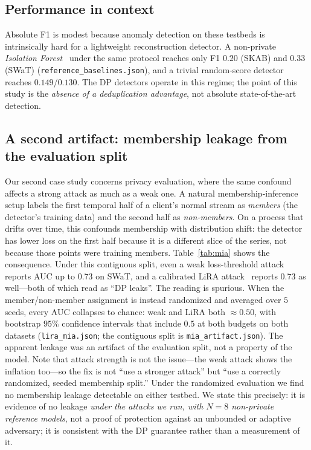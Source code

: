 \documentclass[pdflatex,sn-mathphys-num]{sn-jnl}
\theoremstyle{thmstyleone}
\theoremstyle{thmstyletwo}
\theoremstyle{thmstylethree}
\begin{document}
\subsection{Performance in context}\label{sec:res-context}
Absolute F1 is modest because anomaly detection on these testbeds is intrinsically
hard for a lightweight reconstruction detector. A non-private \emph{Isolation
Forest}~\cite{liu2008isolation} under the same protocol reaches only F1 $0.20$
(SKAB) and $0.33$ (SWaT) (\texttt{reference\_baselines.json}), and a trivial
random-score detector reaches $0.149$/$0.130$. The DP detectors operate in this
regime; the point of this study is the \emph{absence of a deduplication advantage},
not absolute state-of-the-art detection.

\subsection{A second artifact: membership leakage from the evaluation split}\label{sec:res-privacy}
Our second case study concerns privacy evaluation, where the same confound affects a strong attack as much as a weak one. A natural membership-inference setup labels the first
temporal half of a client's normal stream as \emph{members} (the detector's training
data) and the second half as \emph{non-members}. On a process that drifts over time,
this confounds membership with distribution shift: the detector has lower loss on the
first half because it is a different slice of the series, not because those points
were training members. Table~\ref{tab:mia} shows the consequence. Under this
contiguous split, even a weak loss-threshold attack reports AUC up to $0.73$ on SWaT,
and a calibrated LiRA attack~\cite{carlini2022membership} reports $0.73$ as
well---both of which read as ``DP leaks''. The reading is spurious. When the
member/non-member assignment is instead randomized and averaged over $5$ seeds, every
AUC collapses to chance: weak and LiRA both $\approx0.50$, with bootstrap $95\%$
confidence intervals that include $0.5$ at both budgets on both datasets
(\texttt{lira\_mia.json}; the contiguous split is \texttt{mia\_artifact.json}). The
apparent leakage was an artifact of the evaluation split, not a property of the model.
Note that attack strength is not the issue---the weak attack shows the inflation
too---so the fix is not ``use a stronger attack'' but ``use a correctly randomized,
seeded membership split.'' Under the randomized evaluation we find no membership leakage
detectable on either testbed. We state this precisely: it is evidence of no leakage
\emph{under the attacks we run, with $N{=}8$ non-private reference models}, not a proof
of protection against an unbounded or adaptive adversary; it is consistent with the DP
guarantee rather than a measurement of it.
\end{document}
